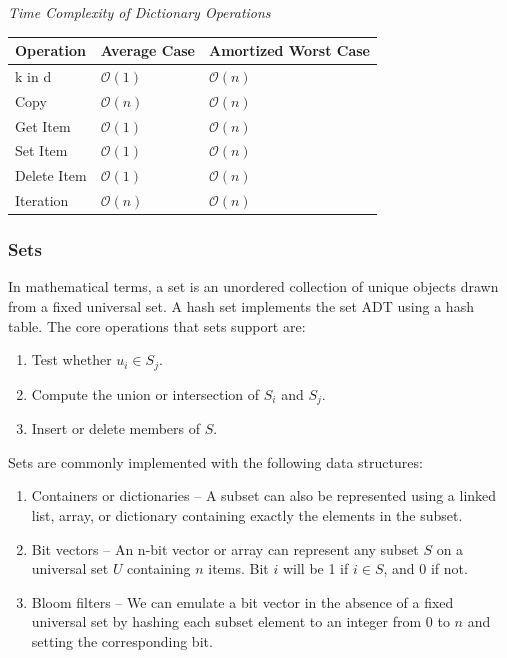 \documentclass{article}
\newcommand{\bigO}{\mathcal{O}}
\begin{document}
   \vspace{8pt} \emph{Time Complexity of Dictionary Operations}
    \begin{table}[H]
        \begin{tabular}{|l|l|l|}
            \hline
            \textbf{Operation} & \textbf{Average Case} & \textbf{Amortized Worst Case} \\
            \hline
            k in d & $\bigO(1)$ & $\bigO(n)$ \\
            Copy & $\bigO(n)$ & $\bigO(n)$ \\
            Get Item & $\bigO(1)$ & $\bigO(n)$ \\
            Set Item & $\bigO(1)$ & $\bigO(n)$ \\
            Delete Item & $\bigO(1)$ & $\bigO(n)$ \\
            Iteration & $\bigO(n)$ & $\bigO(n)$ \\
            \hline
        \end{tabular}
    \end{table}
    
    \subsubsection{Sets}
    In mathematical terms, a set is an unordered collection of unique objects drawn from a fixed universal set. A hash set implements the set ADT using a hash table. The core operations that sets support are:
    
    \begin{enumerate}
        \item Test whether $u_i \in S_j$.
        \item Compute the union or intersection of $S_i$ and $S_j$.
        \item Insert or delete members of $S$.
    \end{enumerate}
    
    Sets are commonly implemented with the following data structures:
    
    \begin{enumerate}
        \item Containers or dictionaries – A subset can also be represented using a linked list, array, or dictionary containing exactly the elements in the subset.
        \item Bit vectors – An n-bit vector or array can represent any subset $S$ on a universal set $U$ containing $n$ items. Bit $i$ will be 1 if $i \in S$, and $0$ if not.
        \item Bloom filters – We can emulate a bit vector in the absence of a fixed universal set by hashing each subset element to an integer from $0$ to $n$ and setting the corresponding bit.
    \end{enumerate}
    
\end{document}
